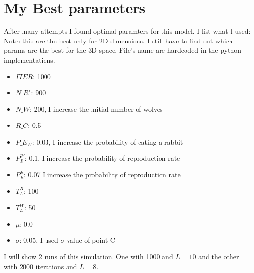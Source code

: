 \documentclass[unicode,11pt,a4paper,oneside,numbers=endperiod,openany]{scrartcl}
\begin{document}
\section*{My Best parameters}
After many attempts I found optimal paramters for this model. I list what I used:
Note: this are the best only for 2D dimensions. I still have to find out which params are the best for the 3D space. File's name are hardcoded in the python implementations. 
\begin{itemize}
  \item $ITER$: 1000
  \item $N\_R$": 900
  \item $N\_W$: 200, I increase the initial number of wolves
  \item $R\_C$: 0.5
  \item $P\_E_W$: 0.03, I increase the probability of eating a rabbit
  \item $P_R^W$: 0.1, I increase the probability of reproduction rate
  \item $P_R^R$: 0.07 I increase the probability of reproduction rate
  \item $T_D^R$: 100 
  \item $T_D^W$: 50
  \item $ \mu$: 0.0
  \item $\sigma$: 0.05, I used $\sigma$ value of point C
\end{itemize}
I will show 2 runs of this simulation. One with 1000 and $L=10$ and the other with 2000 iterations and $L=8$. 
\end{document}
